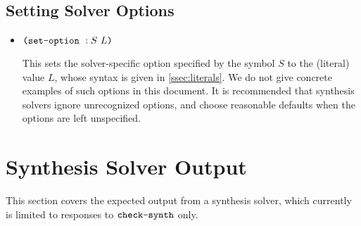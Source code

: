 \documentclass[english,a4paper,10pt]{article}
\begin{document}
\subsection{Setting Solver Options}

\begin{itemize}
\item $\texttt{(}\texttt{set-option}\mbox{ }:S\mbox{ }L\texttt{)}$

This sets the solver-specific option specified by the symbol $S$ 
to the (literal) value $L$, whose syntax is given in \cref{ssec:literals}.
We do not give concrete examples of such options in this document. %
It is recommended that synthesis solvers
ignore unrecognized options, 
and choose reasonable defaults when the
options are left unspecified.
\end{itemize}

\section{Synthesis Solver Output}%
\label{sec:output}

This section covers the expected output from a synthesis solver,
which currently is limited to responses to $\texttt{check-synth}$ 
only.
\end{document}
